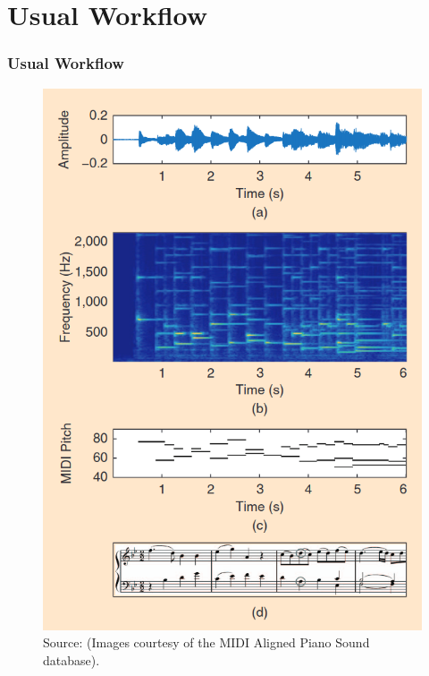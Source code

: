 \documentclass{beamer}
\newcommand{\emp}[1]{\textcolor{tum}{\textbf{#1}}}
\begin{document}
\section{Usual Workflow}
\begin{frame}[shrink=15]
	\frametitle{Usual Workflow}



	\begin{figure}[!ht]
		\centering
		\includegraphics[width=.4\textwidth]{workflow.png}
		\caption{Source: \cite{Overview} (Images courtesy of the MIDI Aligned Piano Sound database).}
		\label{fig:workflow}
	\end{figure}

\end{frame}
\end{document}
